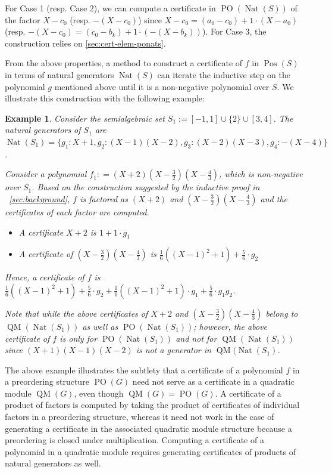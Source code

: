 \documentclass[preprint,12pt,authoryear]{elsarticle}
\newtheorem{example}[theorem]{Example}
\newenvironment{example1}
  {\begin{example}\rm}
  {\end{example}}
\DeclareMathOperator{\Nat}{Nat}
\DeclareMathOperator{\PO}{PO}
\DeclareMathOperator{\QM}{QM}
\DeclareMathOperator{\Pos}{Pos}
\begin{document}
For Case 1 (resp. Case 2), we can compute a certificate in $\PO(\Nat(S))$ of the
factor $X-c_0$ (resp. $-(X - c_0)$) since
$X - c_0 = (a_0 - c_0) + 1 \cdot (X - a_0)$ (resp.
$-(X - c_0) = (c_0 - b_k) + 1 \cdot (-(X - b_k))$). For Case 3, the construction
relies on \th\ref{sec:cert-elem-ponats}.

From the above properties, a method to construct a certificate of $f$ in
$\Pos(S)$ in terms of natural generators $\Nat(S)$ can iterate the inductive
step on the polynomial $g$ mentioned above until it is a non-negative polynomial
over $S$.  We illustrate this construction with the following example:

\begin{example1}
  \th\label{sec:background-2} Consider the semialgebraic set
  $S_1 := [-1, 1] \cup \{2\} \cup [3, 4]$. The natural generators of $S_1$ are
  $\Nat(S_1) = \{ g_1 : X+1, g_2 : (X-1)(X-2), g_3 : (X-2)(X-3), g_4 :
  -(X-4)\}$. 

  Consider a polynomial $f_1 : = (X + 2)(X-\frac{3}{2})(X-\frac{4}{3})$, which
  is non-negative over $S_1$. Based on the construction suggested by the
  inductive proof in ~\th\ref{sec:background}, $f$ is factored as $(X+2)$ and
  $(X-\frac{3}{2})(X-\frac{4}{3})$ and the certificates of each factor are
 computed.
  
  \begin{itemize}
  \item A certificate $X + 2$ is $1 + 1 \cdot g_1$

\item A certificate of $(X-\frac{3}{2})(X-\frac{4}{3})$ is
    $\frac{1}{6}((X-1)^2 + 1) + \frac{5}{6} \cdot g_2$
  \end{itemize}

  Hence, a certificate of $f$ is
  $\frac{1}{6}((X-1)^2 + 1) + \frac{5}{6} \cdot g_2 + \frac{1}{6}((X-1)^2 + 1)
  \cdot g_1 + \frac{5}{6} \cdot g_1 g_2$.

  Note that while the above certificates of $X+2$ and
  $(X-\frac{3}{2})(X-\frac{4}{3})$ belong to $\QM(\Nat(S_1))$ as well as
  $\PO(\Nat(S_1))$; however, the above certificate of $f$ is only for
  $\PO(\Nat(S_1))$ and not for $\QM(\Nat(S_1))$ since $(X+1)(X-1)(X-2)$ is not a
  generator in $\QM(\Nat(S_1)$.
\end{example1}

The above example illustrates the subtlety that a certificate of a polynomial
$f$ in a preordering structure $\PO(G)$ need not serve as a certificate in a
quadratic module $\QM(G)$, even though $\QM(G) = \PO(G)$. A certificate of a
product of factors is computed by taking the product of certificates of
individual factors in a preordering structure, whereas it need not work in the case
of generating a certificate in the associated quadratic module structure because
a preordering is closed under multiplication. Computing a certificate of a
polynomial in a quadratic module requires generating certificates of products of
natural generators as well.
\end{document}
